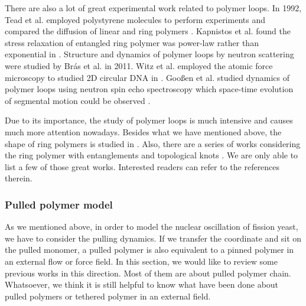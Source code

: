 There are also a lot of great experimental work related to polymer loops. In 1992, Tead et al. employed polystyrene molecules to perform experiments and compared the diffusion of linear and ring polymers \cite{Tead1992}. Kapnistos et al. found the stress relaxation of entangled ring polymer was power-law rather than exponential in \cite{Kapnistos2008}. Structure and dynamics of polymer loops by neutron scattering were studied by Br\'{a}s et al. in 2011. Witz et al. employed the atomic force microscopy to studied 2D circular DNA in \cite{Witz2008,Witz2011}.  Goo{\ss}en et al. studied dynamics of polymer loops using neutron spin echo spectroscopy which space-time evolution of segmental motion could be observed \cite{goossen2014,Goossen2015}. 

Due to its importance, the study of polymer loops is much intensive and causes much more attention nowadays. Besides what we have mentioned above, the shape of ring polymers is studied in \cite{Bishop1985,Jagodzinski1992,Alim2007,Reiss2011}. Also, there are a series of works considering the ring polymer with entanglements and topological knots \cite{Michels1982,Polymers1991,Koniaris1991,Grosberg1996,Shimamura2001,Orlandini2003,Tubiana2011,Uehara2014,Li2015a}.
We are only able to list a few of those great works. Interested readers can refer to the references therein. 

\subsubsection{Pulled polymer model}
\label{ssub:Pulled polymer model}

As we mentioned above, in order to model the nuclear oscillation of fission yeast, we have to consider the pulling dynamics. If we transfer the coordinate and sit on the pulled monomer, a pulled polymer is also equivalent to a pinned polymer in an external flow or force field. In this section, we would like to review some previous works in this direction. Most of them are about pulled polymer chain. Whatsoever, we think it is still helpful to know what have been done about pulled polymers or tethered polymer in an external field.

